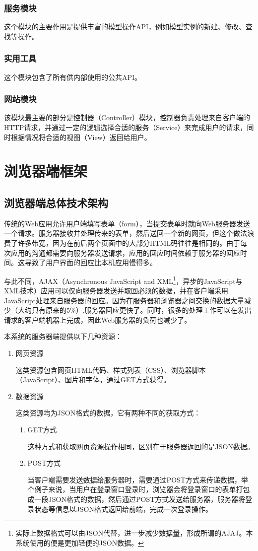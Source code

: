 \subsubsection{服务模块}
这个模块的主要作用是提供丰富的模型操作API，例如模型实例的新建、修改、查找等操作。

\subsubsection{实用工具}
这个模块包含了所有供内部使用的公共API。

\subsubsection{网站模块}
该模块最主要的部分是控制器（Controller）模块，控制器负责处理来自客户端的HTTP请求，并通过一定的逻辑选择合适的服务（Service）来完成用户的请求，同时根据情况将合适的视图（View）返回给用户。

\section{浏览器端框架}
\subsection{浏览器端总体技术架构}
传统的Web应用允许用户端填写表单（form），当提交表单时就向Web服务器发送一个请求。服务器接收并处理传来的表单，然后送回一个新的网页，但这个做法浪费了许多带宽，因为在前后两个页面中的大部分HTML码往往是相同的。由于每次应用的沟通都需要向服务器发送请求，应用的回应时间依赖于服务器的回应时间。这导致了用户界面的回应比本机应用慢得多。

与此不同，AJAX（Asynchronous JavaScript and XML\footnote{实际上数据格式可以由JSON代替，进一步减少数据量，形成所谓的AJAJ。本系统使用的便是更加轻便的JSON数据。}，异步的JavaScript与XML技术）应用可以仅向服务器发送并取回必须的数据，并在客户端采用JavaScript处理来自服务器的回应。因为在服务器和浏览器之间交换的数据大量减少（大约只有原来的5\%）,服务器回应更快了。同时，很多的处理工作可以在发出请求的客户端机器上完成，因此Web服务器的负荷也减少了。

本系统的服务器端提供以下几种资源：
\begin{enumerate}
	\item 网页资源

	这类资源包含网页HTML代码、样式列表（CSS）、浏览器脚本（JavaScript）、图片和字体，通过GET方式获得。
	\item 数据资源

	这类资源均为JSON格式的数据，它有两种不同的获取方式：
	\begin{enumerate}
		\item GET方式

		这种方式和获取网页资源操作相同，区别在于服务器返回的是JSON数据。
		\item POST方式

		当客户端需要发送数据给服务器时，需要通过POST方式来传递数据，举个例子来说，当用户在登录窗口登录时，浏览器会将登录窗口的表单打包成一段JSON格式的数据，然后通过POST方式发送给服务器，服务器将登录状态等信息以JSON格式返回给前端，完成一次登录操作。
	\end{enumerate}
\end{enumerate}

